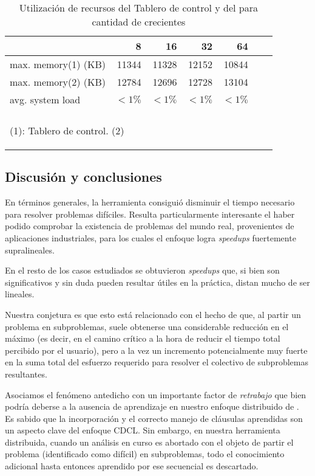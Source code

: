 \begin{table}
	\centering
	\begin{tabular}{lrrrrrr}
		
			\ws 				&	8 		&	16		&	32 		&	64	\\
		\toprule	
			max. memory(1) (KB)	&	11344	&	11328	&	12152	&	10844 \\
			max. memory(2) (KB)	&	12784	&	12696	&	12728 	&	13104 \\
			avg. system load	&	$<1\%$	&	$<1\%$	&	$<1\%$ 	&	$<1\%$ \\
		\bottomrule \\
		\multicolumn{5}{l}{\begin{tiny}(1): Tablero de control. (2) \master \end{tiny}}
	\end{tabular}
	\caption{Utilización de recursos del Tablero de control y del \master para cantidad de \ws crecientes}
	\label{tab:incremental}
\end{table}

\subsection{Discusión y conclusiones}


En términos generales, la herramienta consiguió disminuir el tiempo necesario para resolver problemas difíciles. Resulta particularmente interesante el haber podido comprobar la existencia de problemas del mundo real, provenientes de aplicaciones industriales, para los cuales el enfoque logra \emph{speedups} fuertemente supralineales.

En el resto de los casos estudiados se obtuvieron \emph{speedups} que, si bien son significativos y sin duda pueden resultar útiles en la práctica, distan mucho de ser lineales.

Nuestra conjetura es que esto está relacionado con el hecho de que, al partir un problema en subproblemas, suele obtenerse una considerable reducción en el máximo (es decir, en el camino crítico a la hora de reducir el tiempo total percibido por el usuario), pero a la vez un incremento potencialmente muy fuerte en la suma total del esfuerzo requerido para resolver el colectivo de subproblemas resultantes. 

Asociamos el fenómeno antedicho con un importante factor de \emph{retrabajo} que bien podría deberse a la ausencia de aprendizaje en nuestro enfoque distribuido de \ssolving. Es sabido que la incorporación y el correcto manejo de cláusulas aprendidas son un aspecto clave del enfoque CDCL. Sin embargo, en nuestra herramienta distribuida, cuando un análisis en curso es abortado con el objeto de partir el problema (identificado como difícil) en subproblemas, todo el conocimiento adicional hasta entonces aprendido por ese \ssolver secuencial es descartado.

